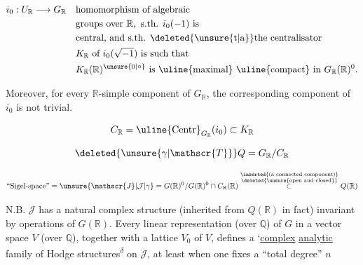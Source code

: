 \[
\begin{aligned}
i_0:U_{\mathbb{R}}\longrightarrow G_{\mathbb{R}}\quad &\text{homomorphism of algebraic}\\
&\text{groups over }\mathbb{R},\ \text{s.th. }i_0(-1)\text{ is}\\
&\text{central, and s.th. \deleted{\unsure{t|a}}the centralisator}\\
&K_{\mathbb{R}}\text{ of }i_0(\sqrt{-1})\text{ is such that}\\
&K_{\mathbb{R}}(\mathbb{R})^{\unsure{0|\circ}}\text{ is \uline{maximal} \uline{compact} in }G_{\mathbb{R}}(\mathbb{R})^{0}.
\end{aligned}
\]

Moreover, for every $\mathbb{R}$-simple component of $G_{\mathbb{R}}$, the corresponding component of $i_0$ is not trivial.

\[
C_{\mathbb{R}}=\text{\uline{Centr}}_{G_{\mathbb{R}}}(i_0)\subset K_{\mathbb{R}}
\]

\[
\deleted{\unsure{\gamma|\mathscr{T}}}Q=G_{\mathbb{R}}/C_{\mathbb{R}}
\]

\[
\text{``Sigel-space''}=\unsure{\mathscr{J}|\mathcal{J}|\gamma}=G(\mathbb{R})^{0}/G(\mathbb{R})^{0}\cap C_{\mathbb{R}}(\mathbb{R})
\overset{\substack{\inserted{\text{(a connected component)}}\\ \deleted{\text{\unsure{open and closed}}}}}{\subset}Q(\mathbb{R})
\]

N.B. $\mathscr{J}$ has a natural complex structure (inherited from  $Q(\mathbb{R})$ in fact) invariant by operations of $G(\mathbb{R})$. Every linear representation (over $\mathbb{Q}$) of $G$ in a vector space $V$ (over $\mathbb{Q}$), together with a lattice $V_0$ of $V$, defines a `\uline{complex} \uline{analytic} family  of Hodge structures\textsuperscript{\ensuremath{\delta}} on $\mathscr{J}$, at least when one fixes a ``total degree'' $n$



